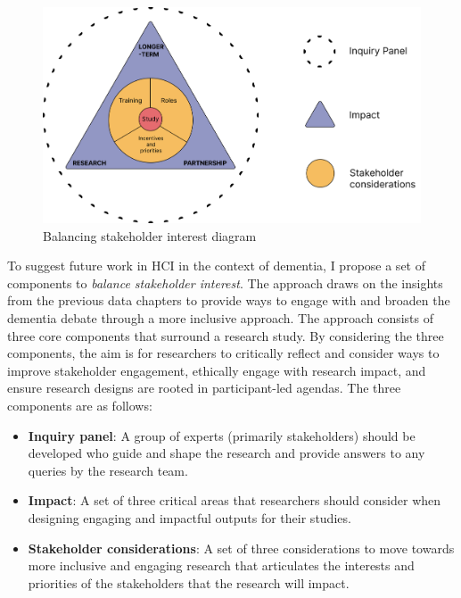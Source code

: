 \begin{figure}[htp]
\centering
\includegraphics[width=0.8\linewidth]{Images/Discussion/StakeholderInterest.png}
\caption{Balancing stakeholder interest diagram}
\label{fig:MeaningfulParticipation}
\end{figure}
To suggest future work in HCI in the context of dementia, I propose a set of components to \textit{balance stakeholder interest}. The approach draws on the insights from the previous data chapters to provide ways to engage with and broaden the dementia debate through a more inclusive approach. The approach consists of three core components that surround a research study. By considering the three components, the aim is for researchers to critically reflect and consider ways to improve stakeholder engagement, ethically engage with research impact, and ensure research designs are rooted in participant-led agendas. The three components are as follows:

\begin{itemize}
    \item \textbf{Inquiry panel}: A group of experts (primarily stakeholders) should be developed who guide and shape the research and provide answers to any queries by the research team.
    \item \textbf{Impact}: A set of three critical areas that researchers should consider when designing engaging and impactful outputs for their studies.
    \item \textbf{Stakeholder considerations}: A set of three considerations to move towards more inclusive and engaging research that articulates the interests and priorities of the stakeholders that the research will impact.
\end{itemize}

